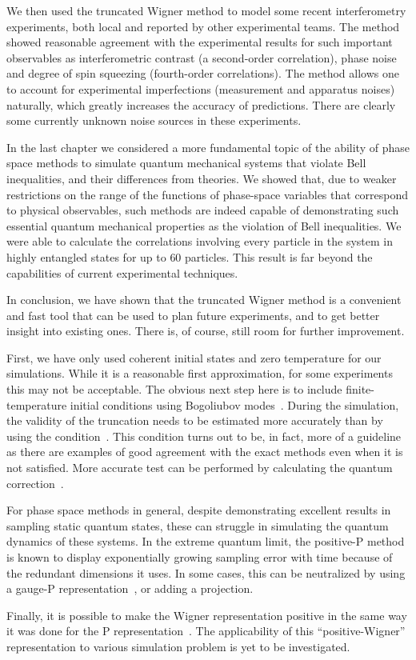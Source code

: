 We then used the truncated Wigner method to model some recent  interferometry experiments, both local and reported by other experimental teams.
The method showed reasonable agreement with the experimental results for such important observables as interferometric contrast (a second-order correlation), phase noise and degree of spin squeezing (fourth-order correlations).
The method allows one to account for experimental imperfections (measurement and apparatus noises) naturally, which greatly increases the accuracy of predictions.
There are clearly some currently unknown noise sources in these experiments.

In the last chapter we considered a more fundamental topic of the ability of phase space methods to simulate quantum mechanical systems that violate Bell inequalities, and their differences from  theories.
We showed that, due to weaker restrictions on the range of the functions of phase-space variables that correspond to physical observables, such methods are indeed capable of demonstrating such essential quantum mechanical properties as the violation of Bell inequalities.
We were able to calculate the correlations involving every particle in the system in highly entangled  states for up to $60$ particles.
This result is far beyond the capabilities of current experimental techniques.

\centerline{\asterism}

In conclusion, we have shown that the truncated Wigner method is a convenient and fast tool that can be used to plan future experiments, and to get better insight into existing ones.
There is, of course, still room for further improvement.

First, we have only used coherent initial states and zero temperature for our simulations.
While it is a reasonable first approximation, for some experiments this may not be acceptable.
The obvious next step here is to include finite-temperature initial conditions using Bogoliubov modes~\cite{Steel1998,Sinatra2002,Ruostekoski2005,Isella2006,Blakie2008}.
During the simulation, the validity of the truncation needs to be estimated more accurately than by using the condition~.
This condition turns out to be, in fact, more of a guideline as there are examples of good agreement with the exact methods even when it is not satisfied.
More accurate test can be performed by calculating the quantum correction~\cite{Polkovnikov2010}.

For phase space methods in general, despite demonstrating excellent results in sampling static quantum states, these can struggle in simulating the quantum dynamics of these systems.
In the extreme quantum limit, the positive-P method is known to display exponentially growing sampling error with time because of the redundant dimensions it uses.
In some cases, this can be neutralized by using a gauge-P representation~\cite{Deuar2002,Deuar2005a}, or adding a projection.

Finally, it is possible to make the Wigner representation positive in the same way it was done for the P representation~\cite{Plimak2001}.
The applicability of this ``positive-Wigner'' representation to various simulation problem is yet to be investigated.
